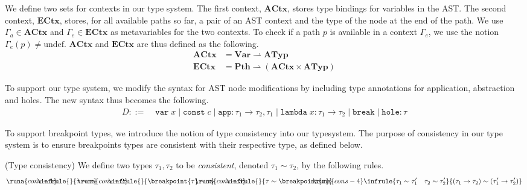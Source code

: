 We define two sets for contexts in our type system. The first context, $\mathbf{ACtx}$, stores type bindings for variables in the AST. The second context, $\mathbf{ECtx}$, stores, for all available paths so far, a pair of an AST context and the type of the node at the end of the path. We use $\Gamma_a \in \mathbf{ACtx}$ and $\Gamma_e \in \mathbf{ECtx}$ as metavariables for the two contexts. To check if a path $p$ is available in a context $\Gamma_e$, we use the notion $\Gamma_e(p) \neq \text{undef}$. $\mathbf{ACtx}$ and $\mathbf{ECtx}$ are thus defined as the following.
%
\begin{align*}
\mathbf{ACtx} &= \mathbf{Var} \rightharpoonup \mathbf{ATyp}\\
\mathbf{ECtx} &= \mathbf{Pth} \rightharpoonup \left(\mathbf{ACtx} \times \mathbf{ATyp}\right)
\end{align*}

To support our type system, we modify the syntax for AST node modifications by including type annotations for application, abstraction and holes. The new syntax thus becomes the following.
%
\begin{align*}
  D ::= \; & \texttt{var}\;x \mid \texttt{const}\;c \mid \texttt{app} : \tau_1 \rightarrow \tau_2, \tau_1 \mid \texttt{lambda}\; x : \tau_1 \rightarrow \tau_2 \mid \texttt{break} \mid \texttt{hole} : \tau
\end{align*}

To support breakpoint types, we introduce the notion of type consistency into our typesystem. The purpose of consistency in our type system is to ensure breakpoints types are consistent with their respective type, as defined below.
%
\begin{definition}{(Type consistency)}
    We define two types $\tau_1, \tau_2$ to be \textit{consistent}, denoted $\tau_1 \sim \tau_2$, by the following rules.
    \begin{align*}
        \runa{cons-1} \hspace{-1cm}
        \infrule{}{\tau \sim \tau} \hspace{-1cm}
        \runa{cons-2} \hspace{-1cm}
        \infrule{}{\breakpoint{\tau} \sim \tau} \hspace{-1cm}
        \runa{cons-3} \hspace{-1cm}
        \infrule{}{\tau \sim \breakpoint{\tau}} \hspace{-1cm}
        \runa{cons-4}
        \infrule{\tau_1 \sim \tau_1' \quad \tau_2 \sim \tau_2'}{(\tau_1 \rightarrow \tau_2) \sim (\tau_1' \rightarrow \tau_2')}
    \end{align*}
\end{definition}


